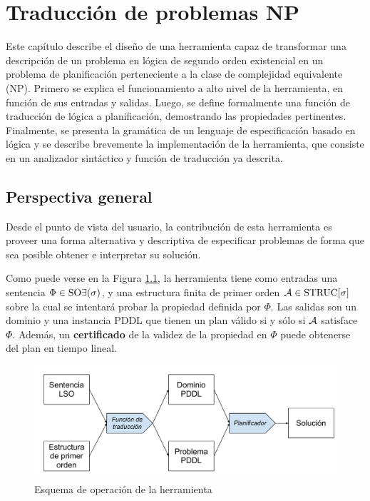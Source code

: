 
\chapter{Traducción de problemas NP}
\label{Chapter2}
Este capítulo describe el diseño de una herramienta capaz de transformar una
descripción de un problema en lógica de segundo orden existencial
en un problema de planificación perteneciente a la clase de complejidad
equivalente (NP).
Primero se explica el funcionamiento a alto nivel de la herramienta, en función
de sus entradas y salidas. Luego, se define formalmente una función de
traducción de lógica a planificación, demostrando las propiedades pertinentes.
Finalmente, se presenta la gramática de un lenguaje de especificación basado en lógica 
y se describe brevemente la implementación de la herramienta, que consiste en un 
analizador sintáctico y función de traducción ya descrita.

\section{Perspectiva general}
Desde el punto de vista del usuario, la contribución de esta herramienta es
proveer una forma alternativa y descriptiva de especificar problemas de forma
que sea posible obtener e interpretar su solución.

Como puede verse en la Figura \ref{esquema_herramienta}, la herramienta tiene
como entradas una sentencia $\Phi\in\text{SO}\exists(\sigma)$, y
una estructura finita de primer orden $\mathcal{A}\in\text{STRUC}[\sigma]$ sobre la cual se
intentará probar la propiedad definida por $\Phi$.
Las salidas son un dominio y una instancia PDDL que tienen un plan válido si y
sólo si $\mathcal{A}$ satisface $\Phi$. Además, un \textbf{certificado} de la validez de
la propiedad en $\Phi$ puede obtenerse del plan en tiempo lineal.

\begin{figure}[h]
\centering
\includegraphics[width=\textwidth]{figuras/esquema_herramienta.pdf}
\caption{Esquema de operación de la herramienta}
\label{esquema_herramienta}
\end{figure}

